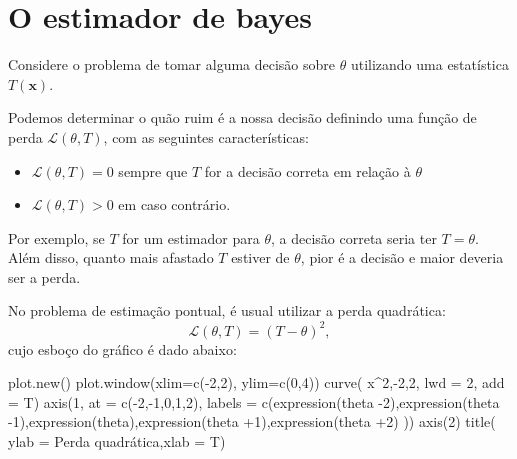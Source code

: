 \documentclass[
  letterpaper,
  DIV=11,
  numbers=noendperiod]{scrreprt}
\newenvironment{Shaded}{\begin{snugshade}}{\end{snugshade}}
\newcommand{\AttributeTok}[1]{\textcolor[rgb]{0.40,0.45,0.13}{#1}}
\newcommand{\DecValTok}[1]{\textcolor[rgb]{0.68,0.00,0.00}{#1}}
\newcommand{\FunctionTok}[1]{\textcolor[rgb]{0.28,0.35,0.67}{#1}}
\newcommand{\NormalTok}[1]{\textcolor[rgb]{0.00,0.23,0.31}{#1}}
\newcommand{\SpecialCharTok}[1]{\textcolor[rgb]{0.37,0.37,0.37}{#1}}
\newcommand{\StringTok}[1]{\textcolor[rgb]{0.13,0.47,0.30}{#1}}
\theoremstyle{definition}
\theoremstyle{definition}
\theoremstyle{remark}
\begin{document}

\hypertarget{o-estimador-de-bayes}{%
\chapter{O estimador de bayes}\label{o-estimador-de-bayes}}

Considere o problema de tomar alguma decisão sobre \(\theta\) utilizando
uma estatística \(T(\mathbf{x})\).

Podemos determinar o quão ruim é a nossa decisão definindo uma função de
perda \(\mathcal{L}(\theta,T)\), com as seguintes características:

\begin{itemize}
\item
  \(\mathcal{L}(\theta,T)=0\) sempre que \(T\) for a decisão correta em
  relação à \(\theta\)
\item
  \(\mathcal{L}(\theta,T)>0\) em caso contrário.
\end{itemize}

Por exemplo, se \(T\) for um estimador para \(\theta\), a decisão
correta seria ter \(T=\theta\). Além disso, quanto mais afastado \(T\)
estiver de \(\theta\), pior é a decisão e maior deveria ser a perda.

No problema de estimação pontual, é usual utilizar a perda quadrática:
\[\mathcal{L}(\theta,T)=(T-\theta)^2,\] cujo esboço do gráfico é dado
abaixo:

\begin{Shaded}
\begin{Highlighting}[]
\FunctionTok{plot.new}\NormalTok{()}
\FunctionTok{plot.window}\NormalTok{(}\AttributeTok{xlim=}\FunctionTok{c}\NormalTok{(}\SpecialCharTok{{-}}\DecValTok{2}\NormalTok{,}\DecValTok{2}\NormalTok{), }\AttributeTok{ylim=}\FunctionTok{c}\NormalTok{(}\DecValTok{0}\NormalTok{,}\DecValTok{4}\NormalTok{))}
\FunctionTok{curve}\NormalTok{( x}\SpecialCharTok{\^{}}\DecValTok{2}\NormalTok{,}\SpecialCharTok{{-}}\DecValTok{2}\NormalTok{,}\DecValTok{2}\NormalTok{, }\AttributeTok{lwd =} \DecValTok{2}\NormalTok{, }\AttributeTok{add =}\NormalTok{ T)}
\FunctionTok{axis}\NormalTok{(}\DecValTok{1}\NormalTok{, }\AttributeTok{at =} \FunctionTok{c}\NormalTok{(}\SpecialCharTok{{-}}\DecValTok{2}\NormalTok{,}\SpecialCharTok{{-}}\DecValTok{1}\NormalTok{,}\DecValTok{0}\NormalTok{,}\DecValTok{1}\NormalTok{,}\DecValTok{2}\NormalTok{), }\AttributeTok{labels =} \FunctionTok{c}\NormalTok{(}\FunctionTok{expression}\NormalTok{(theta }\SpecialCharTok{{-}}\DecValTok{2}\NormalTok{),}\FunctionTok{expression}\NormalTok{(theta }\SpecialCharTok{{-}}\DecValTok{1}\NormalTok{),}\FunctionTok{expression}\NormalTok{(theta),}\FunctionTok{expression}\NormalTok{(theta }\SpecialCharTok{+}\DecValTok{1}\NormalTok{),}\FunctionTok{expression}\NormalTok{(theta }\SpecialCharTok{+}\DecValTok{2}\NormalTok{) ))}
\FunctionTok{axis}\NormalTok{(}\DecValTok{2}\NormalTok{)}
\FunctionTok{title}\NormalTok{( }\AttributeTok{ylab =} \StringTok{\textquotesingle{}Perda quadrática\textquotesingle{}}\NormalTok{,}\AttributeTok{xlab =} \StringTok{\textquotesingle{}T\textquotesingle{}}\NormalTok{)}
\end{Highlighting}
\end{Shaded}
\end{document}
